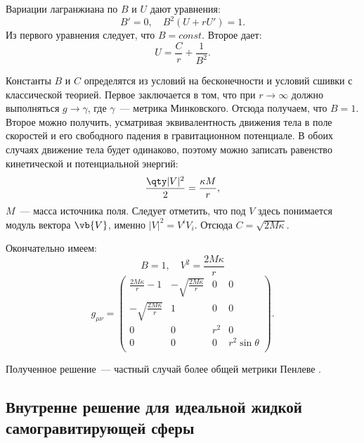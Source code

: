 \documentclass[\docroot/reports/draft/report.tex]{subfiles}
\begin{document}
    Вариации лагранжиана по $B$ и $U$ дают уравнения:
    \begin{equation*}
        B' = 0 , \quad B^2 (U + r U') = 1 .
    \end{equation*}
    Из первого уравнения следует, что $B = const$. Второе дает:
    \begin{equation*}
        U = \frac{C}{r} + \frac{1}{B^2} .
    \end{equation*}

    Константы $B$ и $C$ определятся из условий на бесконечности и условий сшивки с классической теорией. Первое заключается в том, что при $r \to \infty$ должно выполняться $g \to \gamma$, где $\gamma$~--- метрика Минковского. Отсюда получаем, что $B = 1$. Второе можно получить, усматривая эквивалентность движения тела в поле скоростей и его свободного падения в гравитационном потенциале. В обоих случаях движение тела будет одинаково, поэтому можно записать равенство кинетической и потенциальной энергий:
    \begin{equation*}
        \frac{\qty|V|^2}{2} = \frac{\kappa M}{r} ,
    \end{equation*}
    $M$~--- масса источника поля. Следует отметить, что под $V$ здесь понимается модуль вектора $\vb{V}$, именно $|V|^2 = V^i V_i$. Отсюда $C = \sqrt{2 M \kappa}$.

    Окончательно имеем:
    \begin{equation*}
        B = 1, \quad V^2 = \frac{2 M \kappa}{r}
    \end{equation*}
    \begin{equation*}
        g_{\mu\nu} = \begin{pmatrix}
            \frac{2 M \kappa}{r} - 1 & -\sqrt{\frac{2 M \kappa}{r}} & 0 & 0 \\
            -\sqrt{\frac{2 M \kappa}{r}} & 1 & 0 & 0 \\
            0 & 0 & r^2 & 0 \\
            0 & 0 & 0 & r^2 \sin\theta \\
        \end{pmatrix} .
    \end{equation*}

    Полученное решение~--- частный случай более общей метрики Пенлеве \cite{burlankov_new_phys}.

\subsection{Внутренне решение для идеальной жидкой самогравитирующей сферы}
\end{document}
